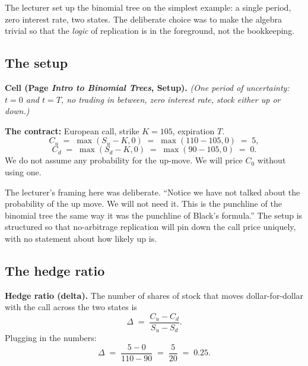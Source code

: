 The lecturer set up the binomial tree on the simplest example: a
single period, zero interest rate, two states. The deliberate choice
was to make the algebra trivial so that the \emph{logic} of
replication is in the foreground, not the bookkeeping.

\subsection{The setup}\label{L8-sec:setup}

\begin{keyblock}
\textbf{Cell (Page \emph{Intro to Binomial Trees}, Setup).}
\emph{(One period of uncertainty: $t = 0$ and $t = T$, no trading
in between, zero interest rate, stock either up or down.)}
\begin{center}
\end{center}
\textbf{The contract:} European call, strike $K = 105$, expiration $T$.
\[
  C_u \;=\; \max(S_u - K, 0) \;=\; \max(110 - 105, 0) \;=\; 5,
\]
\[
  C_d \;=\; \max(S_d - K, 0) \;=\; \max(90 - 105, 0) \;=\; 0.
\]
We do not assume any probability for the up-move. We will price $C_0$
without using one.
\end{keyblock}

The lecturer's framing here was deliberate. ``Notice we have not
talked about the probability of the up move. We will not need it.
This is the punchline of the binomial tree the same way it was the
punchline of Black's formula.'' The setup is structured so that
no-arbitrage replication will pin down the call price uniquely, with
no statement about how likely up is.

\subsection{The hedge ratio}\label{L8-sec:hedge}

\begin{keyblock}
\textbf{Hedge ratio (delta).} The number of shares of stock that
moves dollar-for-dollar with the call across the two states is
\[
  \Delta \;=\; \frac{C_u - C_d}{S_u - S_d}.
\]
Plugging in the numbers:
\[
  \Delta \;=\; \frac{5 - 0}{110 - 90} \;=\; \frac{5}{20} \;=\; 0.25.
\]
\end{keyblock}

